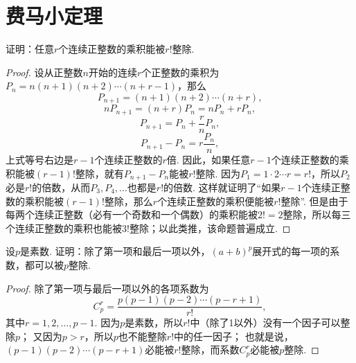 \section{费马小定理}
\begin{lemma}\label{theorem:初等数论.费马小定理.引理0}
证明：任意\(r\)个连续正整数的乘积能被\(r!\)整除.
\begin{proof}
设从正整数\(n\)开始的连续\(r\)个正整数的乘积为\(P_n = n(n+1)(n+2)\dotsm(n+r-1)\)，那么\begin{equation*}
P_{n+1} = (n+1)(n+2)\dotsm(n+r),
\end{equation*}\begin{equation*}
n P_{n+1} = (n+r) P_n = n P_n + r P_n,
\end{equation*}\begin{equation*}
P_{n+1} = P_n + \frac{r}{n} P_n,
\end{equation*}\begin{equation*}
P_{n+1} - P_n = r \frac{P_n}{n},
\end{equation*}上式等号右边是\(r-1\)个连续正整数的\(r\)倍.
因此，如果任意\(r-1\)个连续正整数的乘积能被\((r-1)!\)整除，就有\(P_{n+1} - P_n\)能被\(r!\)整除.
因为\(P_1 = 1 \cdot 2 \dotsm r = r!\)，所以\(P_2\)必是\(r!\)的倍数，从而\(P_3,P_4,\dotsc\)也都是\(r!\)的倍数.
这样就证明了“如果\(r-1\)个连续正整数的乘积能被\((r-1)!\)整除，那么\(r\)个连续正整数的乘积便能被\(r!\)整除”.
但是由于每两个连续正整数（必有一个奇数和一个偶数）的乘积能被\(2!=2\)整除，所以每三个连续正整数的乘积也能被\(3!\)整除；以此类推，该命题普遍成立.
\end{proof}
\end{lemma}

\begin{lemma}\label{theorem:初等数论.费马小定理.引理1}
设\(p\)是素数.
证明：除了第一项和最后一项以外，\((a+b)^p\)展开式的每一项的系数，都可以被\(p\)整除.
\begin{proof}
除了第一项与最后一项以外的各项系数为\begin{equation*}
C_p^r = \frac{p(p-1)(p-2)\dotsm(p-r+1)}{r!},
\end{equation*}其中\(r=1,2,\dotsc,p-1\).
因为\(p\)是素数，所以\(r!\)中（除了1以外）没有一个因子可以整除\(p\)；
又因为\(p>r\)，所以\(p\)也不能整除\(r!\)中的任一因子；
也就是说，\((p-1)(p-2)\dotsm(p-r+1)\)必能被\(r!\)整除，而系数\(C_p^r\)必能被\(p\)整除.
\end{proof}
\end{lemma}

